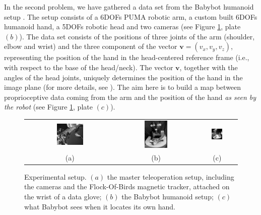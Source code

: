 \documentclass[conference]{IEEEtran}
\begin{document}
In the second problem, we have gathered a data set from the Babybot
humanoid setup \cite{babybotHum2005}. The setup consists of a 6DOFs
PUMA robotic arm, a custom built 6DOFs humanoid hand, a 5DOFs robotic
head and two cameras (see Figure \ref{fig:setup}, plate $(b)$). The
data set consists of the positions of three joints of the arm
(shoulder, elbow and wrist) and the three component of the vector
$\mathbf{v} = (v_x,v_y,v_z)$, representing the position of the hand in
the head-centered reference frame (i.e., with respect to the base of
the head/neck). The vector $\mathbf{v}$, together with the angles of
the head joints, uniquely determines the position of the hand in the
image plane (for more details, see \cite{NatalePhD}). The aim here is
to build a map between proprioceptive data coming from the arm and the
position of the hand \emph{as seen by the robot} (see Figure
\ref{fig:setup}, plate $(c)$).

\begin{figure}[!htbp]
  \begin{center}
    \begin{tabular}{ccc}
      \includegraphics[width=0.31\textwidth]{master} &
       \includegraphics[width=0.31\textwidth]{babybot} &
       \includegraphics[width=0.31\textwidth]{pov} \\[5mm]
       (a) & (b) & (c)
    \end{tabular}
  \end{center}
  \caption{\label{fig:setup} Experimental setup. $(a)$ the master
  teleoperation setup, including the cameras and the Flock-Of-Birds
  magnetic tracker, attached on the wrist of a data glove; $(b)$ the
  Babybot humanoid setup; $(c)$ what Babybot sees when it locates its
  own hand.}
\end{figure}
\end{document}

